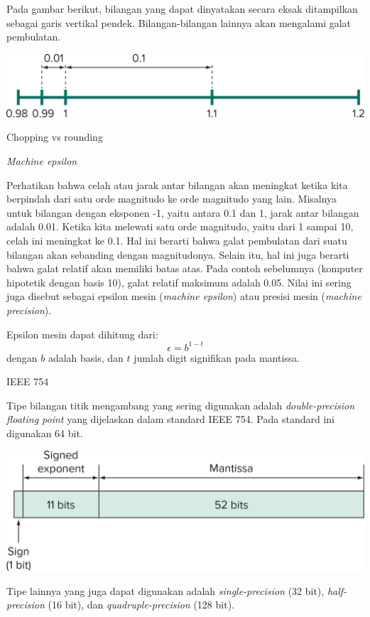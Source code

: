 \begin{frame}

Pada gambar berikut, bilangan yang dapat dinyatakan secara eksak ditampilkan sebagai garis
vertikal pendek. Bilangan-bilangan lainnya akan mengalami galat pembulatan.

{\centering
\includegraphics[height=0.2\textheight]{../chapra_python/Chapra_Fig_4_5.png}
\par}

Chopping vs rounding

\end{frame}


\begin{frame}{\textit{Machine epsilon}}

Perhatikan bahwa celah atau jarak antar bilangan akan meningkat ketika kita berpindah dari
satu orde magnitudo ke orde magnitudo yang lain. Misalnya untuk bilangan dengan
eksponen -1, yaitu antara 0.1 dan 1, jarak antar bilangan adalah 0.01. Ketika kita melewati
satu orde magnitudo, yaitu dari 1 sampai 10, celah ini meningkat ke 0.1. Hal ini berarti bahwa
galat pembulatan dari suatu bilangan akan sebanding dengan magnitudonya. Selain itu, hal ini
juga berarti bahwa galat relatif akan memiliki batas atas. Pada contoh sebelumnya (komputer
hipotetik dengan basis 10), galat relatif maksimum adalah 0.05. Nilai ini sering
juga disebut sebagai epsilon mesin (\textit{machine epsilon})
atau presisi mesin (\textit{machine precision}).

Epsilon mesin dapat dihitung dari:
$$
\epsilon = b^{1-t}
$$
dengan $b$ adalah basis, dan $t$ jumlah digit signifikan pada mantissa.

\end{frame}


\begin{frame}{IEEE 754}

Tipe bilangan titik mengambang yang sering digunakan adalah \textit{double-precision
floating point} yang dijelaskan dalam standard IEEE 754. Pada standard ini digunakan
64 bit.

{\centering
\includegraphics[height=0.25\textheight]{../chapra_python/Chapra_Fig_4_6.png}
\par}

Tipe lainnya yang juga dapat digunakan adalah \textit{single-precision} (32 bit),
\textit{half-precision} (16 bit), dan \textit{quadruple-precision} (128 bit).

\end{frame}



